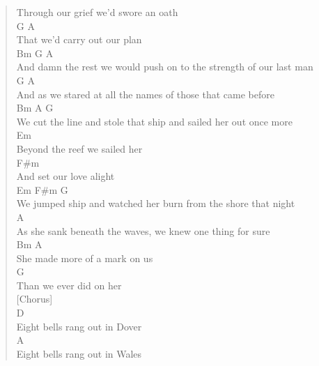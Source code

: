 \documentclass[11pt]{article}
\begin{document}
\begin{verse}
Through our grief we'd swore an oath\\
\hspace*{11em}G             A\\
That we'd carry out our plan\\
\hspace*{5em}Bm                                     G                 A\\
And damn the rest we would push on to the strength of our last man\\
\hspace*{5em}G                                 A\\
And as we stared at all the names of those that came before\\
\hspace*{3em}Bm                 A                   G\\
We cut the line and stole that ship and sailed her out once more\\
\vspace*{1em}
\hspace*{2em}Em\\
Beyond the reef we sailed her\\
\hspace*{4em}F\#m\\
And set our love alight\\
Em                                  F\#m                   G\\
We jumped ship and watched her burn from the shore that night\\
\hspace*{35em}A\\
As she sank beneath the waves, we knew one thing for sure\\
Bm                  A\\
She made more of a mark on us\\
\hspace*{9em}G\\
Than we ever did on her\\
\vspace*{1em}
\vspace*{1em}
[Chorus]\\
\vspace*{1em}
\hspace*{7em}D\\
Eight bells rang out in Dover\\
\hspace*{7em}A\\
Eight bells rang out in Wales\\

\end{verse}
\end{document}
